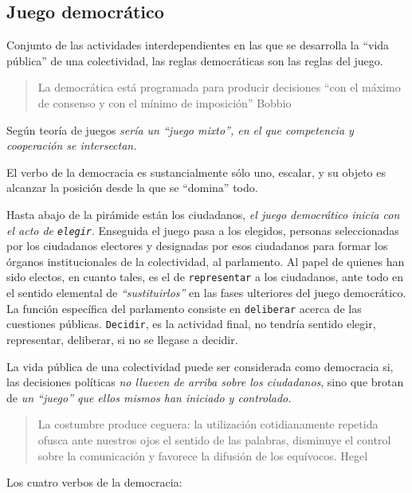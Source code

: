 \documentclass[
  letterpaper,
  DIV=11,
  numbers=noendperiod]{scrreprt}
\begin{document}
\subsection{Juego democrático}\label{juego-democruxe1tico}

Conjunto de las actividades interdependientes en las que se desarrolla
la ``vida pública'' de una colectividad, las reglas democráticas son las
reglas del juego.

\begin{quote}
La democrática está programada para producir decisiones ``con el máximo
de consenso y con el mínimo de imposición'' Bobbio
\end{quote}

Según teoría de juegos \emph{sería un ``juego mixto'', en el que
competencia y cooperación se intersectan.}

El verbo de la democracia es sustancialmente sólo uno, escalar, y su
objeto es alcanzar la posición desde la que se ``domina'' todo.

Hasta abajo de la pirámide están los ciudadanos, \emph{el juego
democrático inicia con el acto de \texttt{elegir}}. Enseguida el juego
pasa a los elegidos, personas seleccionadas por los ciudadanos electores
y designadas por esos ciudadanos para formar los órganos institucionales
de la colectividad, al parlamento. Al papel de quienes han sido electos,
en cuanto tales, es el de \texttt{representar} a los ciudadanos, ante
todo en el sentido elemental de \emph{``sustituirlos''} en las fases
ulteriores del juego democrático. La función específica del parlamento
consiste en \texttt{deliberar} acerca de las cuestiones públicas.
\texttt{Decidir}, es la actividad final, no tendría sentido elegir,
representar, deliberar, si no se llegase a decidir.

La vida pública de una colectividad puede ser considerada como
democracia si, las decisiones políticas \emph{no llueven de arriba sobre
los ciudadanos}, sino que brotan de \emph{un ``juego'' que ellos mismos
han iniciado y controlado.}

\begin{quote}
La costumbre produce ceguera: la utilización cotidianamente repetida
ofusca ante nuestros ojos el sentido de las palabras, disminuye el
control sobre la comunicación y favorece la difusión de los equívocos.
Hegel
\end{quote}

Los cuatro verbos de la democracia:
\end{document}
